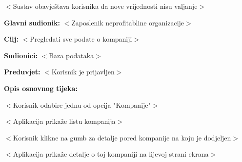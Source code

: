 \begin{packed_item}
\begin{packed_enum}
\begin{packed_item}
\begin{packed_enum}
									\item $<$Sustav obavještava korisnika da nove vrijednosti nisu valjanje$>$

								\end{packed_enum}

							\end{packed_item}

						\end{packed_enum}
					\end{packed_item}

					\noindent {}
					\begin{packed_item}

						\item \textbf{Glavni sudionik: }$<$Zaposlenik neprofitabline organizacije$>$
						\item  \textbf{Cilj:} $<$Pregledati sve podate o kompaniji$>$
						\item  \textbf{Sudionici:} $<$Baza podataka$>$
						\item  \textbf{Preduvjet:} $<$Korisnik je prijavljen$>$
						\item  \textbf{Opis osnovnog tijeka:}

						\item[] \begin{packed_enum}

							\item $<$Korisnik odabire jednu od opcija "Kompanije"$>$
							\item $<$Aplikacija prikaže listu kompanija$>$
							\item $<$Korisnik klikne na gumb za detalje pored kompanije na koju je dodjeljen$>$
							\item $<$Aplikacija prikaže detalje o toj kompaniji na lijevoj strani ekrana$>$
						\end{packed_enum}
					\end{packed_item}

